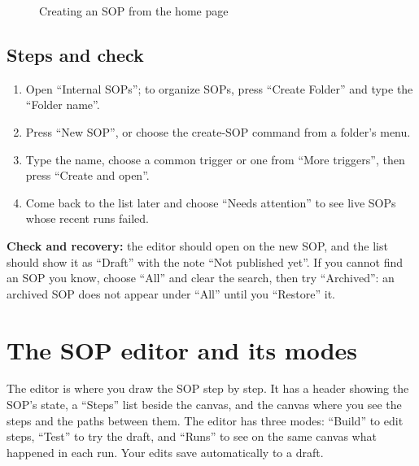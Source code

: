 \begin{figure}[H]
\centering
{}
\rclegend
\caption{Creating an SOP from the home page}
\label{fig:builder-internal-sops-flow}
\end{figure}

\subsection{Steps and check}
\begin{enumerate}
\item Open “Internal SOPs”; to organize SOPs, press “Create Folder” and type the “Folder name”.
\item Press “New SOP”, or choose the create-SOP command from a folder's menu.
\item Type the name, choose a common trigger or one from “More triggers”, then press “Create and open”.
\item Come back to the list later and choose “Needs attention” to see live SOPs whose recent runs failed.
\end{enumerate}

\textbf{Check and recovery:} the editor should open on the new SOP, and the list should show it as “Draft” with the note “Not published yet”. If you cannot find an SOP you know, choose “All” and clear the search, then try “Archived”: an archived SOP does not appear under “All” until you “Restore” it.

\clearpage
\section{The SOP editor and its modes}
\label{sec:builder-feature-isop-editor}

The editor is where you draw the SOP step by step. It has a header showing the SOP's state, a “Steps” list beside the canvas, and the canvas where you see the steps and the paths between them. The editor has three modes: “Build” to edit steps, “Test” to try the draft, and “Runs” to see on the same canvas what happened in each run. Your edits save automatically to a draft.

